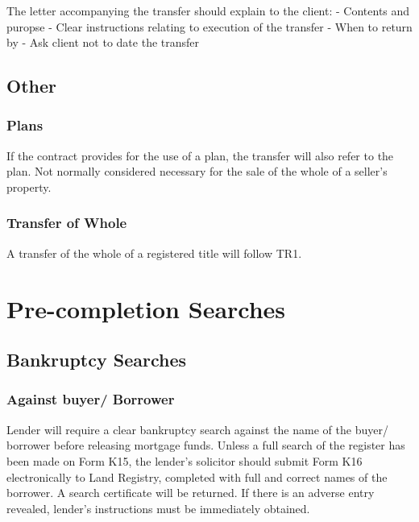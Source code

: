 \documentclass[
]{article}
\newenvironment{Shaded}{}{}
\newcommand{\NormalTok}[1]{#1}
\begin{document}
\begin{Shaded}
\begin{Highlighting}[]
\NormalTok{The letter accompanying the transfer should explain to the client: }
\NormalTok{{-} Contents and puropse}
\NormalTok{{-} Clear instructions relating to execution of the transfer}
\NormalTok{{-} When to return by}
\NormalTok{{-} Ask client not to date the transfer}
\end{Highlighting}
\end{Shaded}

\hypertarget{other}{%
\subsection{Other}\label{other}}

\hypertarget{plans}{%
\subsubsection{Plans}\label{plans}}

If the contract provides for the use of a plan, the transfer will also
refer to the plan. Not normally considered necessary for the sale of the
whole of a seller's property.

\hypertarget{transfer-of-whole}{%
\subsubsection{Transfer of Whole}\label{transfer-of-whole}}

A transfer of the whole of a registered title will follow TR1.

\hypertarget{pre-completion-searches}{%
\section{Pre-completion Searches}\label{pre-completion-searches}}

\hypertarget{bankruptcy-searches}{%
\subsection{Bankruptcy Searches}\label{bankruptcy-searches}}

\hypertarget{against-buyer-borrower}{%
\subsubsection{Against buyer/ Borrower}\label{against-buyer-borrower}}

Lender will require a clear bankruptcy search against the name of the
buyer/ borrower before releasing mortgage funds. Unless a full search of
the register has been made on Form K15, the lender's solicitor should
submit Form K16 electronically to Land Registry, completed with full and
correct names of the borrower. A search certificate will be returned. If
there is an adverse entry revealed, lender's instructions must be
immediately obtained.
\end{document}
